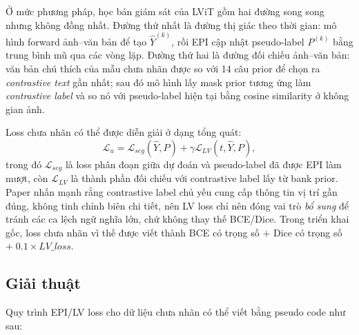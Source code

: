 Ở mức phương pháp, học bán giám sát của LViT gồm hai đường song song nhưng không đồng nhất. Đường thứ nhất là đường thị giác theo thời gian: mô hình forward ảnh--văn bản để tạo \(\hat{Y}^{(k)}\), rồi EPI cập nhật pseudo-label \(P^{(k)}\) bằng trung bình mũ qua các vòng lặp. Đường thứ hai là đường đối chiếu ảnh--văn bản: văn bản chú thích của mẫu chưa nhãn được so với 14 câu prior để chọn ra \emph{contrastive text} gần nhất; sau đó mô hình lấy mask prior tương ứng làm \emph{contrastive label} và so nó với pseudo-label hiện tại bằng cosine similarity ở không gian ảnh.

Loss chưa nhãn có thể được diễn giải ở dạng tổng quát:
\[
\mathcal{L}_{u}
=
\mathcal{L}_{seg}(\hat{Y},P)
+ \gamma \mathcal{L}_{LV}(t,\hat{Y},P),
\]
trong đó \(\mathcal{L}_{seg}\) là loss phân đoạn giữa dự đoán và pseudo-label đã được EPI làm mượt, còn \(\mathcal{L}_{LV}\) là thành phần đối chiếu với contrastive label lấy từ bank prior. Paper nhấn mạnh rằng contrastive label chủ yếu cung cấp thông tin vị trí gần đúng, không tinh chỉnh biên chi tiết, nên LV loss chỉ nên đóng vai trò \emph{bổ sung} để tránh các ca lệch ngữ nghĩa lớn, chứ không thay thế BCE/Dice. Trong triển khai gốc, loss chưa nhãn vì thế được viết thành BCE có trọng số \(+\) Dice có trọng số \(+\;0.1\times LV\_loss\).

\subsection*{Giải thuật}

Quy trình EPI/LV loss cho dữ liệu chưa nhãn có thể viết bằng pseudo code như sau:


